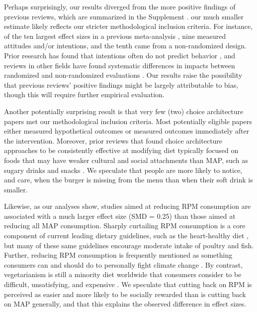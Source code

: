 \documentclass[sn-nature,referee,pdflatex]{sn-jnl}
\begin{document}
Perhaps surprisingly, our results diverged from the more positive
findings of previous reviews, which are summarized in the Supplement
\citep{mathur2021meta, meier2022, mertens2022}. our much smaller
estimate likely reflects our stricter methodological inclusion criteria.
For instance, of the ten largest effect sizes in a previous
meta-analysis \citep{mathur2021effectiveness}, nine measured attitudes
and/or intentions, and the tenth came from a non-randomized design.
Prior research has found that intentions often do not predict behavior
\citep{mathur2021effectiveness}, and reviews in other fields have found
systematic differences in impacts between randomized and non-randomized
evaluations \citep{porat2024, stevenson2023}. Our results raise the
possibility that previous reviews' positive findings might be largely
attributable to bias, though this will require further empirical
evaluation.

Another potentially surprising result is that very few (two) choice
architecture papers met our methodological inclusion criteria. Most
potentially eligible papers either measured hypothetical outcomes or
measured outcomes immediately after the intervention. Moreover, prior
reviews that found choice architecture approaches to be consistently
effective at modifying diet typically focused on foods that may have
weaker cultural and social attachments than MAP, such as sugary drinks
and snacks \citep{venema2020, adriaanse2009}. We speculate that people
are more likely to notice, and care, when the burger is missing from the
menu than when their soft drink is smaller.

Likewise, as our analyses show, studies aimed at reducing RPM
consumption are associated with a much larger effect size (SMD = 0.25)
than those aimed at reducing all MAP consumption. Sharply curtailing RPM
consumption is a core component of current leading dietary guidelines,
such as the heart-healthy diet \citep{diab2023}, but many of these same
guidelines encourage moderate intake of poultry and fish. Further,
reducing RPM consumption is frequently mentioned as something consumers
can and should do to personally fight climate change
\citep{auclair2024}. By contrast, vegetarianism is still a minority diet
worldwide \citep{tilman2014} that consumers consider to be difficult,
unsatisfying, and expensive \citep{bryant2019}. We speculate that
cutting back on RPM is perceived as easier and more likely to be
socially rewarded than is cutting back on MAP generally, and that this
explains the observed difference in effect sizes.
\end{document}
